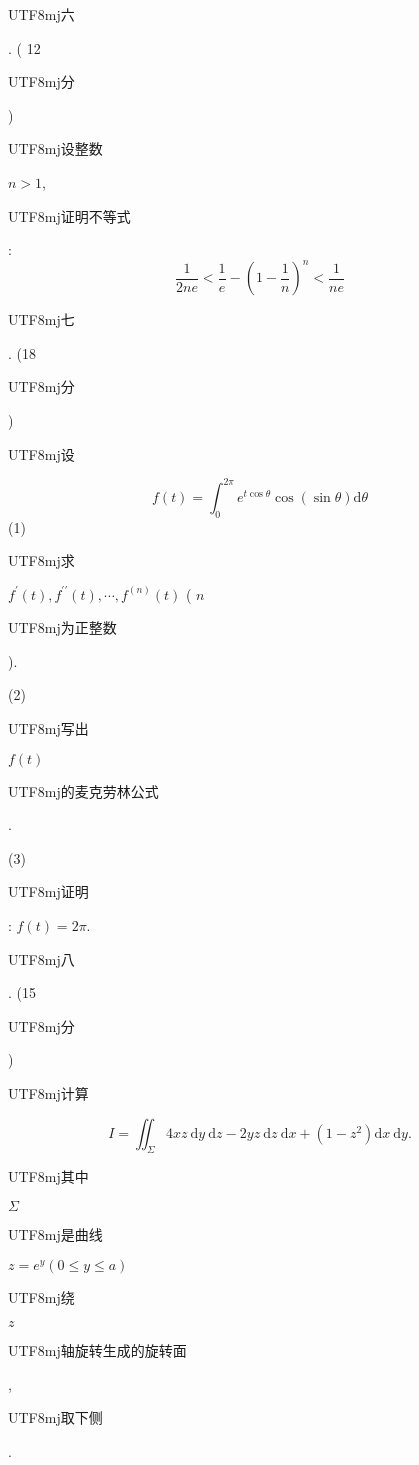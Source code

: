 \documentclass[10pt]{article}
\begin{document}
\begin{CJK}{UTF8}{mj}六\end{CJK}. ( 12 \begin{CJK}{UTF8}{mj}分\end{CJK}) \begin{CJK}{UTF8}{mj}设整数\end{CJK} $n>1$, \begin{CJK}{UTF8}{mj}证明不等式\end{CJK}:
$$
\frac{1}{2 n e}<\frac{1}{e}-\left(1-\frac{1}{n}\right)^{n}<\frac{1}{n e}
$$
\begin{CJK}{UTF8}{mj}七\end{CJK}. (18 \begin{CJK}{UTF8}{mj}分\end{CJK}) \begin{CJK}{UTF8}{mj}设\end{CJK}
$$
f(t)=\int_{0}^{2 \pi} e^{t \cos \theta} \cos (\sin \theta) \mathrm{d} \theta
$$
(1) \begin{CJK}{UTF8}{mj}求\end{CJK} $f^{\prime}(t), f^{\prime \prime}(t), \cdots, f^{(n)}(t)$ ( $n$ \begin{CJK}{UTF8}{mj}为正整数\end{CJK}).

(2) \begin{CJK}{UTF8}{mj}写出\end{CJK} $f(t)$ \begin{CJK}{UTF8}{mj}的麦克劳林公式\end{CJK}.

(3) \begin{CJK}{UTF8}{mj}证明\end{CJK}: $f(t)=2 \pi$.

\begin{CJK}{UTF8}{mj}八\end{CJK}. (15 \begin{CJK}{UTF8}{mj}分\end{CJK}) \begin{CJK}{UTF8}{mj}计算\end{CJK}
$$
I=\iint_{\Sigma} 4 x z \mathrm{~d} y \mathrm{~d} z-2 y z \mathrm{~d} z \mathrm{~d} x+\left(1-z^{2}\right) \mathrm{d} x \mathrm{~d} y .
$$
\begin{CJK}{UTF8}{mj}其中\end{CJK} $\Sigma$ \begin{CJK}{UTF8}{mj}是曲线\end{CJK} $z=e^{y}(0 \leqslant y \leqslant a)$ \begin{CJK}{UTF8}{mj}绕\end{CJK} $z$ \begin{CJK}{UTF8}{mj}轴旋转生成的旋转面\end{CJK}, \begin{CJK}{UTF8}{mj}取下侧\end{CJK}.
\end{document}

